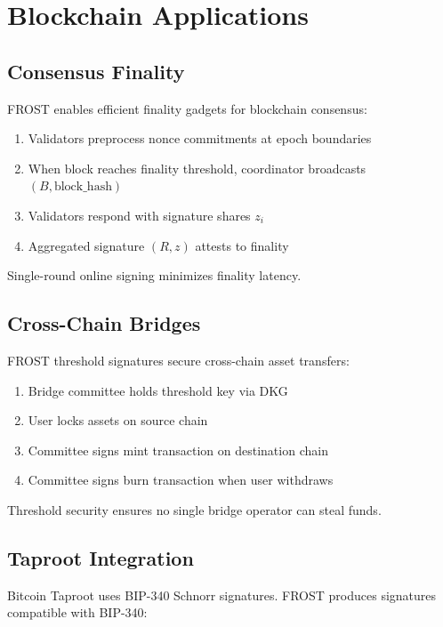 \documentclass[11pt,a4paper]{article}
\begin{document}
\section{Blockchain Applications}

\subsection{Consensus Finality}

FROST enables efficient finality gadgets for blockchain consensus:

\begin{enumerate}
    \item Validators preprocess nonce commitments at epoch boundaries
    \item When block reaches finality threshold, coordinator broadcasts $(B, \text{block\_hash})$
    \item Validators respond with signature shares $z_i$
    \item Aggregated signature $(R, z)$ attests to finality
\end{enumerate}

Single-round online signing minimizes finality latency.

\subsection{Cross-Chain Bridges}

FROST threshold signatures secure cross-chain asset transfers:

\begin{enumerate}
    \item Bridge committee holds threshold key via DKG
    \item User locks assets on source chain
    \item Committee signs mint transaction on destination chain
    \item Committee signs burn transaction when user withdraws
\end{enumerate}

Threshold security ensures no single bridge operator can steal funds.

\subsection{Taproot Integration}

Bitcoin Taproot uses BIP-340 Schnorr signatures. FROST produces signatures compatible with BIP-340:
\end{document}
